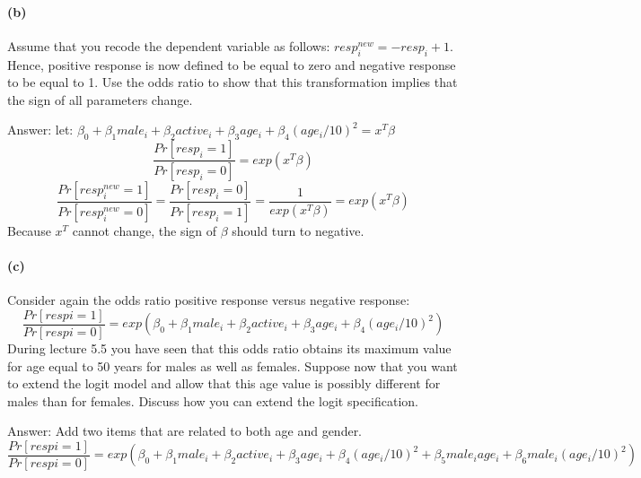 \documentclass{article}
\begin{document}
\paragraph{(b)}
Assume that you recode the dependent variable as follows: $resp^{new}_i = -resp_i + 1$. Hence, positive response is now defined to be equal to zero and negative response to be equal to 1. Use the odds ratio to show that this transformation implies that the sign of all parameters change.

Answer:
let: $\beta_0 + \beta_1 male_i + \beta_2 active_i + \beta_3age_i + \beta_4(age_i/10)^2 = x^T\beta$
\[
\frac{Pr[resp_i = 1]}{Pr[resp_i = 0]} = exp(x^T\beta)
\]
\[
\frac{Pr[resp^{new}_i = 1]}{Pr[resp^{new}_i = 0]} = \frac{Pr[resp_i = 0]}{Pr[resp_i = 1]} = \frac{1}{exp(x^T\beta)} = exp(x^T\beta)
\]
Because $x^T$ cannot change, the sign of $\beta$ should turn to negative.

\paragraph{(c)}
Consider again the odds ratio positive response versus negative response:
\[
\frac{Pr[respi = 1]}{Pr[respi = 0]} = exp(\beta_0 + \beta_1 male_i + \beta_2 active_i + \beta_3 age_i + \beta_4(age_i/10)^2)
\]
During lecture 5.5 you have seen that this odds ratio obtains its maximum value for age equal to 50 years for males as well as females. Suppose now that you want to extend the logit model and allow that this age value is possibly different for males than for females. Discuss how you can extend the logit specification.

Answer:
Add two items that are related to both age and gender.
\[
\frac{Pr[respi = 1]}{Pr[respi = 0]} = exp(\beta_0 + \beta_1 male_i + \beta_2 active_i + \beta_3 age_i + \beta_4(age_i/10)^2 + \beta_5 male_i age_i + \beta_6 male_i(age_i/10)^2)
\]
\end{document}

